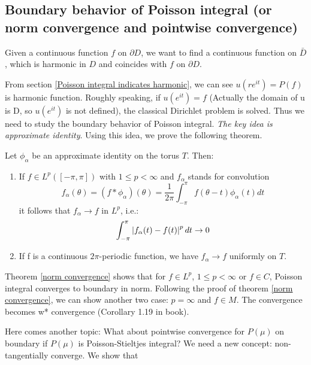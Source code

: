 \subsection{Boundary behavior of Poisson integral (or norm convergence and pointwise convergence)}
\begin{definition}
    Given a continuous function $f$ on $\partial D$, we want to find a continuous function on $\bar{D}$, which is harmonic in $D$ and coincides with $f$ on $\partial D$.
\end{definition}
From section \ref{Poisson integral indicates harmonic}, we can see $u(re^{i t})=P(f)$ is harmonic function. Roughly speaking, if $u(e^{i t})=f$ (Actually the domain of u is D, so $u(e^{i t})$ is not defined),
the classical Dirichlet problem is solved. Thus we need to study the boundary behavior of Poisson integral. \emph{The key idea is approximate identity}. Using this idea, we prove the following theorem.\par
\begin{theorem}\label{norm convergence}
    Let $\phi_\alpha$ be an approximate identity on the torus $T$. Then:
    \begin{enumerate}
        \item If $f\in L^p([-\pi,\pi])$ with $1\leq p<\infty$ and $f_\alpha$ stands for convolution
              \begin{equation*}
                  f_\alpha(\theta)=(f*\phi_\alpha)(\theta)=\frac{1}{2\pi}\int_{-\pi}^{\pi}{f(\theta-t)\phi_\alpha(t)d t}
              \end{equation*}
              it follows that $f_\alpha\to f$ in $L^p$, i.e.:
              \begin{equation*}
                  \int_{-\pi}^{\pi}{\left\lvert f_\alpha(t)-f(t)\right\rvert^p d t}\to 0
              \end{equation*}
        \item If f is a continuous $2\pi$-periodic function, we have $f_\alpha\to f$ uniformly on $T$.
    \end{enumerate}
\end{theorem}
Theorem \ref{norm convergence} shows that for $f\in L^p$, $1\leq p<\infty$ or $f\in C$, Poisson integral converges to boundary in norm.
Following the proof of theorem \ref{norm convergence}, we can show another two case: $p=\infty$ and $f\in M$. The convergence becomes w* convergence (Corollary 1.19 in book).\par
Here comes another topic: What about pointwise convergence for $P(\mu)$ on boundary if $P(\mu)$ is Poisson-Stieltjes integral? We need a new concept: non-tangentially converge. We show that
